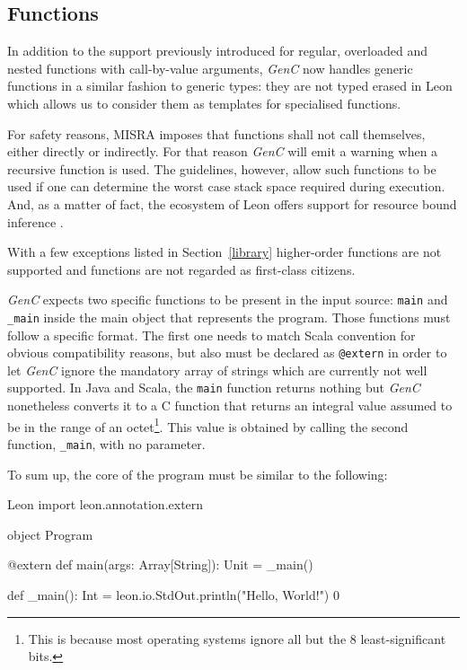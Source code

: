 \documentclass[a4paper,twoside]{article}
\newcommand{\InlineS}[1]{\lstinline[language=Leon]|#1|}
\newcommand{\GenC}{\emph{GenC}\xspace}
\newcommand{\RefSec}[1]{Section~\ref{#1}}
\begin{document}
\subsection{Functions}
\label{function}


In addition to the support previously introduced for regular, overloaded and
nested functions with call-by-value arguments, \GenC now handles generic
functions in a similar fashion to generic types: they are not typed erased in
Leon which allows us to consider them as templates for specialised functions.

For safety reasons, MISRA imposes that functions shall not call themselves,
either directly or indirectly. For that reason \GenC will emit a warning when a
recursive function is used. The guidelines, however, allow such functions to be
used if one can determine the worst case stack space required during execution.
And, as a matter of fact, the ecosystem of Leon offers support for resource
bound inference \cite{Madhavan2014}.

With a few exceptions listed in \RefSec{library} higher-order functions are not
supported and functions are not regarded as first-class citizens.

\GenC expects two specific functions to be present in the input source:
\InlineS{main} and \InlineS{_main} inside the main object that represents the
program. Those functions must follow a specific format. The first one needs to
match Scala convention for obvious compatibility reasons, but also must be
declared as \InlineS{@extern} in order to let \GenC ignore the mandatory array
of strings which are currently not well supported. In Java and Scala, the
\InlineS{main} function returns nothing but \GenC nonetheless converts it to a C
function that returns an integral value assumed to be in the range of an
octet\footnote{This is because most operating systems ignore all but the 8
least-significant bits.}. This value is obtained by calling the second function,
\InlineS{_main}, with no parameter.

\pagebreak[4]
To sum up, the core of the program must be similar to the following:

\begin{ShortCode}{Leon}%
import leon.annotation.extern

object Program {
  @extern
  def main(args: Array[String]): Unit = _main()

  def _main(): Int = {
    leon.io.StdOut.println("Hello, World!")
    0
  }
}
\end{ShortCode}
\end{document}
